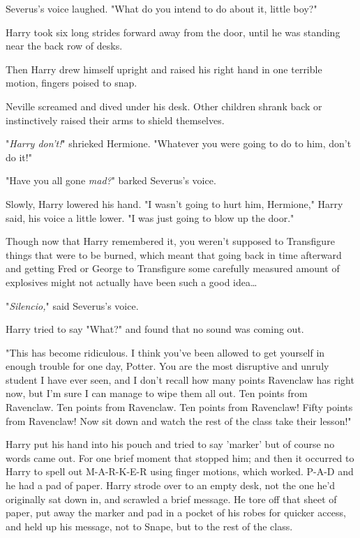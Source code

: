 Severus's voice laughed. "What do you intend to do about it, little boy?"

Harry took six long strides forward away from the door, until he was standing 
near the back row of desks.

Then Harry drew himself upright and raised his right hand in one terrible 
motion, fingers poised to snap.

Neville screamed and dived under his desk. Other children shrank back or 
instinctively raised their arms to shield themselves.

"\emph{Harry don't!}" shrieked Hermione. "Whatever you were going to do to him, 
don't do it!"

"Have you all gone \emph{mad?}" barked Severus's voice.

Slowly, Harry lowered his hand. "I wasn't going to hurt him, Hermione," Harry 
said, his voice a little lower. "I was just going to blow up the door."

Though now that Harry remembered it, you weren't supposed to Transfigure things 
that were to be burned, which meant that going back in time afterward and 
getting Fred or George to Transfigure some carefully measured amount of 
explosives might not actually have been such a good idea{\ldots}

"\emph{Silencio,}" said Severus's voice.

Harry tried to say "What?" and found that no sound was coming out.

"This has become ridiculous. I think you've been allowed to get yourself in 
enough trouble for one day, Potter. You are the most disruptive and unruly 
student I have ever seen, and I don't recall how many points Ravenclaw has 
right now, but I'm sure I can manage to wipe them all out. Ten points from 
Ravenclaw. Ten points from Ravenclaw. Ten points from Ravenclaw! Fifty points 
from Ravenclaw! Now sit down and watch the rest of the class take their lesson!"

Harry put his hand into his pouch and tried to say 'marker' but of course no 
words came out. For one brief moment that stopped him; and then it occurred to 
Harry to spell out M-A-R-K-E-R using finger motions, which worked. P-A-D and he 
had a pad of paper. Harry strode over to an empty desk, not the one he'd 
originally sat down in, and scrawled a brief message. He tore off that sheet of 
paper, put away the marker and pad in a pocket of his robes for quicker access, 
and held up his message, not to Snape, but to the rest of the class.

